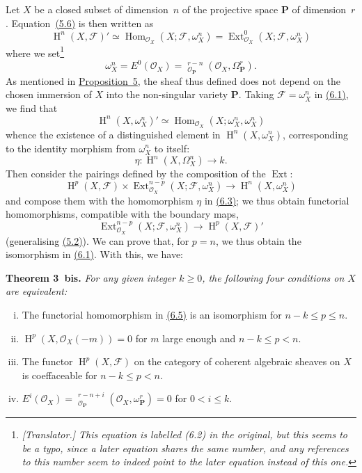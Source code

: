 \documentclass{article}
\newenvironment{itenv}[1]
  {\phantomsection\par\medskip\noindent\textbf{#1.}\itshape}
  {\medskip}
\newcommand{\scr}[1]{{\mathscr{#1}}}
\newcommand{\bb}{\mathbf}
\renewcommand{\geq}{\geqslant}
\renewcommand{\leq}{\leqslant}
\DeclareMathOperator{\Ext}{Ext}
\DeclareMathOperator{\Hom}{Hom}
\DeclareMathOperator{\shExt}{\underline{Ext}}
\DeclareMathOperator{\HH}{H}
\newcommand{\oldpage}[1]{\marginpar{\footnotesize$\Big\vert$ \textit{p.~#1}}}
\begin{document}
Let $X$ be a closed subset of dimension~$n$ of the projective space $\bb{P}$ of dimension~$r$.
Equation~\hyperref[5.6]{(5.6)} is then written as
\[
\label{6.1}
  \HH^n(X,\scr{F})'
  \simeq \Hom_{\scr{O}_X}(X;\scr{F},\omega_X^n)
  = \Ext_{\scr{O}_X}^0(X;\scr{F},\omega_X^n)
\tag{6.1}
\]
where we set\footnote{\emph{[Translator.] This equation is labelled (6.2) in the original, but this seems to be a typo, since a later equation shares the same number, and any references to this number seem to indeed point to the later equation instead of this one.}}
\[
  \omega_X^n = E^0(\scr{O}_X) = \shExt_{\scr{O}_\bb{P}}^{r-n}(\scr{O}_X,\Omega_\bb{P}^r).
\]
As mentioned in \hyperref[proposition5]{Proposition~5}, the sheaf thus defined does not depend on the chosen immersion of $X$ into the non-singular variety $\bb{P}$.
Taking $\scr{F}=\omega_X^n$ in \hyperref[6.1]{(6.1)}, we find that
\[
\label{6.2}
  \HH^n(X,\omega_X^n)' \simeq \Hom_{\scr{O}_X}(X;\omega_X^n,\omega_X^n)
\tag{6.2}
\]
whence the existence of a distinguished element in $\HH^n(X,\omega_X^n)$, corresponding to the identity morphism from $\omega_X^n$ to itself:
\[
\label{6.3}
  \eta\colon \HH^n(X,\Omega_X^n) \to k.
\tag{6.3}
\]
\oldpage{149-18}
Then consider the pairings defined by the composition of the $\Ext$:
\[
\label{6.4}
  \HH^p(X,\scr{F}) \times \Ext_{\scr{O}_X}^{n-p}(X;\scr{F},\omega_X^n)
  \to \HH^n(X,\omega_X^n)
\tag{6.4}
\]
and compose them with the homomorphism $\eta$ in \hyperref[6.3]{(6.3)}; we thus obtain functorial homomorphisms, compatible with the boundary maps,
\[
\label{6.5}
  \Ext_{\scr{O}_X}^{n-p}(X;\scr{F},\omega_X^n) \to \HH^p(X,\scr{F})'
\tag{6.5}
\]
(generalising \hyperref[5.2]{(5.2)}).
We can prove that, for $p=n$, we thus obtain the isomorphism in \hyperref[6.1]{(6.1)}.
With this, we have:

\begin{itenv}{Theorem 3~bis}
\label{theorem3bis}
  For any given integer $k\geq0$, the following four conditions on $X$ are equivalent:
  \begin{enumerate}[i.]
    \item The functorial homomorphism in \hyperref[6.5]{(6.5)} is an isomorphism for $n-k\leq p\leq n$.
    \item $\HH^p(X,\scr{O}_X(-m)) = 0$ for $m$ large enough and $n-k\leq p<n$.
    \item The functor $\HH^p(X,\scr{F})$ on the category of coherent algebraic sheaves on $X$ is coeffaceable for $n-k\leq p<n$.
    \item $E^i(\scr{O}_X) = \shExt_{\scr{O}_\bb{P}}^{r-n+i}(\scr{O}_X,\omega_\bb{P}^r) = 0$ for $0<i\leq k$.
  \end{enumerate}
\end{itenv}
\end{document}
